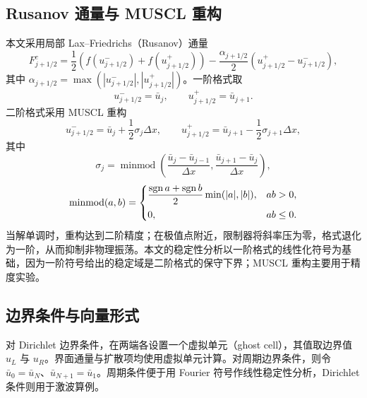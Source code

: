\subsection{Rusanov 通量与 MUSCL 重构}

本文采用局部 Lax--Friedrichs（Rusanov）通量
\begin{equation}
  F^{c}_{j+1/2}
  =\frac12\left(f(u^-_{j+1/2})+f(u^+_{j+1/2})\right)
  -\frac{\alpha_{j+1/2}}{2}\left(u^+_{j+1/2}-u^-_{j+1/2}\right),
  \label{eq:rusanov-burgers}
\end{equation}
其中 $\alpha_{j+1/2}=\max(|u^-_{j+1/2}|,|u^+_{j+1/2}|)$。一阶格式取
\begin{equation}
  u^-_{j+1/2}=\bar u_j,\qquad u^+_{j+1/2}=\bar u_{j+1}.
  \label{eq:first-order-states}
\end{equation}
二阶格式采用 MUSCL 重构
\begin{equation}
  u^-_{j+1/2}=\bar u_j+\frac12\sigma_j\Delta x,\qquad
  u^+_{j+1/2}=\bar u_{j+1}-\frac12\sigma_{j+1}\Delta x,
  \label{eq:muscl-burgers}
\end{equation}
其中
\begin{equation}
  \sigma_j=\operatorname{minmod}\left(
  \frac{\bar u_j-\bar u_{j-1}}{\Delta x},
  \frac{\bar u_{j+1}-\bar u_j}{\Delta x}\right),
  \label{eq:minmod-burgers}
\end{equation}
\begin{equation}
  \operatorname{minmod}(a,b)=
  \begin{cases}
    \dfrac{\operatorname{sgn} a+\operatorname{sgn} b}{2}\min(|a|,|b|), & ab>0,\\[6pt]
    0, & ab\le0.
  \end{cases}
  \label{eq:minmod-burgers-def}
\end{equation}
当解单调时，重构达到二阶精度；在极值点附近，限制器将斜率压为零，格式退化为一阶，从而抑制非物理振荡。本文的稳定性分析以一阶格式的线性化符号为基础，因为一阶符号给出的稳定域是二阶格式的保守下界；MUSCL 重构主要用于精度实验。

\subsection{边界条件与向量形式}

对 Dirichlet 边界条件，在两端各设置一个虚拟单元（ghost cell），其值取边界值 $u_L$ 与 $u_R$。界面通量与扩散项均使用虚拟单元计算。对周期边界条件，则令 $\bar u_0=\bar u_N$、$\bar u_{N+1}=\bar u_1$。周期条件便于用 Fourier 符号作线性稳定性分析，Dirichlet 条件则用于激波算例。

